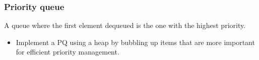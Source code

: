     \subsubsection{Priority queue}
    \begin{definition}
        A queue where the first element dequeued is the one with the highest priority. 
        \begin{itemize}
            \item Implement a PQ using a heap by bubbling up items that are more important for efficient priority management.
        \end{itemize}
        \vspace{1em}
        
        \begin{center}
        \end{center}
    \end{definition}